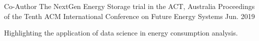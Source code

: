 

\begin{cventries}

  \cventry
    {Co-Author} %
    {The NextGen Energy Storage trial in the ACT, Australia} %
    {Proceedings of the Tenth ACM International Conference on Future Energy Systems} %
    {Jun. 2019} %
    {
      \begin{cvitems} %
        \item {Highlighting the application of data science in energy consumption analysis.}
      \end{cvitems}
    }

\end{cventries}

